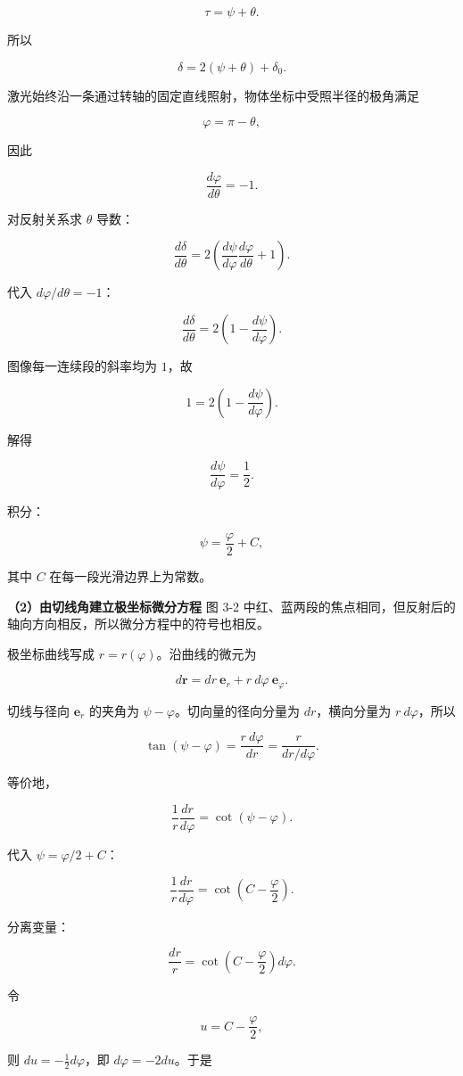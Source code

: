 \documentclass[12pt,a4paper,UTF8]{ctexart}
\begin{document}
\[\tau=\psi+\theta.\]

所以

\[\delta=2(\psi+\theta)+\delta_0.\]

激光始终沿一条通过转轴的固定直线照射，物体坐标中受照半径的极角满足

\[\varphi=\pi-\theta,\]

因此

\[\frac{d\varphi}{d\theta}=-1.\]

对反射关系求 \(\theta\) 导数：

\[\frac{d\delta}{d\theta}
=2\left(\frac{d\psi}{d\varphi}\frac{d\varphi}{d\theta}+1\right).\]

代入 \(d\varphi/d\theta=-1\)：

\[\frac{d\delta}{d\theta}=2\left(1-\frac{d\psi}{d\varphi}\right).\]

图像每一连续段的斜率均为 \(1\)，故

\[1=2\left(1-\frac{d\psi}{d\varphi}\right).\]

解得

\[\boxed{\frac{d\psi}{d\varphi}=\frac12}.\]

积分：

\[\boxed{\psi=\frac\varphi2+C},\]

其中 \(C\) 在每一段光滑边界上为常数。

\textbf{（2）由切线角建立极坐标微分方程} 图 3-2
中红、蓝两段的焦点相同，但反射后的轴向方向相反，所以微分方程中的符号也相反。

极坐标曲线写成 \(r=r(\varphi)\)。沿曲线的微元为

\[d\bm r=dr\ \bm e_r+r\ d\varphi\ \bm e_\varphi.\]

切线与径向 \(\bm e_r\) 的夹角为 \(\psi-\varphi\)。切向量的径向分量为
\(dr\)，横向分量为 \(r\ d\varphi\)，所以

\[\tan(\psi-\varphi)=\frac{r\ d\varphi}{dr}=\frac{r}{dr/d\varphi}.\]

等价地，

\[\frac1r\frac{dr}{d\varphi}=\cot(\psi-\varphi).\]

代入 \(\psi=\varphi/2+C\)：

\[\frac1r\frac{dr}{d\varphi}
=\cot\left(C-\frac\varphi2\right).\]

分离变量：

\[\frac{dr}{r}=\cot\left(C-\frac\varphi2\right)d\varphi.\]

令

\[u=C-\frac\varphi2,\]

则 \(du=-\frac12d\varphi\)，即 \(d\varphi=-2du\)。于是
\end{document}
